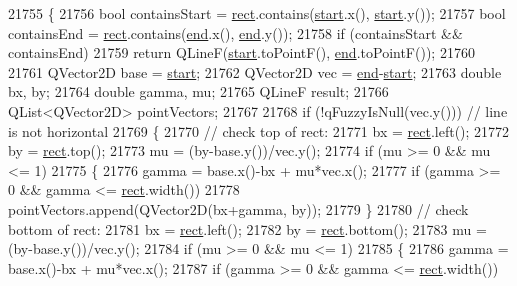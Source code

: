 \begin{DoxyCode}
21755 \{
21756   \textcolor{keywordtype}{bool} containsStart = \hyperlink{_gen_blob_8m_aea8f6815d9a63491fc422c5572c6b3c3}{rect}.contains(\hyperlink{class_q_c_p_item_line_a602da607a09498b0f152ada1d6851bc5}{start}.x(), \hyperlink{class_q_c_p_item_line_a602da607a09498b0f152ada1d6851bc5}{start}.y());
21757   \textcolor{keywordtype}{bool} containsEnd = \hyperlink{_gen_blob_8m_aea8f6815d9a63491fc422c5572c6b3c3}{rect}.contains(\hyperlink{class_q_c_p_item_line_a15598864c1c22a2497a1979c4980c4e1}{end}.x(), \hyperlink{class_q_c_p_item_line_a15598864c1c22a2497a1979c4980c4e1}{end}.y());
21758   \textcolor{keywordflow}{if} (containsStart && containsEnd)
21759     \textcolor{keywordflow}{return} QLineF(\hyperlink{class_q_c_p_item_line_a602da607a09498b0f152ada1d6851bc5}{start}.toPointF(), \hyperlink{class_q_c_p_item_line_a15598864c1c22a2497a1979c4980c4e1}{end}.toPointF());
21760   
21761   QVector2D base = \hyperlink{class_q_c_p_item_line_a602da607a09498b0f152ada1d6851bc5}{start};
21762   QVector2D vec = \hyperlink{class_q_c_p_item_line_a15598864c1c22a2497a1979c4980c4e1}{end}-\hyperlink{class_q_c_p_item_line_a602da607a09498b0f152ada1d6851bc5}{start};
21763   \textcolor{keywordtype}{double} bx, by;
21764   \textcolor{keywordtype}{double} gamma, mu;
21765   QLineF result;
21766   QList<QVector2D> pointVectors;
21767 
21768   \textcolor{keywordflow}{if} (!qFuzzyIsNull(vec.y())) \textcolor{comment}{// line is not horizontal}
21769   \{
21770     \textcolor{comment}{// check top of rect:}
21771     bx = \hyperlink{_gen_blob_8m_aea8f6815d9a63491fc422c5572c6b3c3}{rect}.left();
21772     by = \hyperlink{_gen_blob_8m_aea8f6815d9a63491fc422c5572c6b3c3}{rect}.top();
21773     mu = (by-base.y())/vec.y();
21774     \textcolor{keywordflow}{if} (mu >= 0 && mu <= 1)
21775     \{
21776       gamma = base.x()-bx + mu*vec.x();
21777       \textcolor{keywordflow}{if} (gamma >= 0 && gamma <= \hyperlink{_gen_blob_8m_aea8f6815d9a63491fc422c5572c6b3c3}{rect}.width())
21778         pointVectors.append(QVector2D(bx+gamma, by));
21779     \}
21780     \textcolor{comment}{// check bottom of rect:}
21781     bx = \hyperlink{_gen_blob_8m_aea8f6815d9a63491fc422c5572c6b3c3}{rect}.left();
21782     by = \hyperlink{_gen_blob_8m_aea8f6815d9a63491fc422c5572c6b3c3}{rect}.bottom();
21783     mu = (by-base.y())/vec.y();
21784     \textcolor{keywordflow}{if} (mu >= 0 && mu <= 1)
21785     \{
21786       gamma = base.x()-bx + mu*vec.x();
21787       \textcolor{keywordflow}{if} (gamma >= 0 && gamma <= \hyperlink{_gen_blob_8m_aea8f6815d9a63491fc422c5572c6b3c3}{rect}.width())

\end{DoxyCode}
